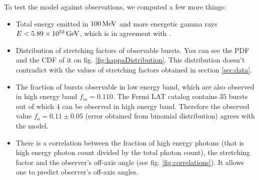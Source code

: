\documentclass[11pt,a4paper]{article}
\begin{document}
To test the model against observations, we computed a few more things:
\begin{itemize}
	\item{
		Total energy emitted in $\unit[100]{MeV}$ and more energetic gamma rays $E < \unit[5.89 \times 10^{53}]{GeV}$, which is in agreement with \cite{Gehrels:2013xd}.
	}
	\item{
		Distribution of stretching factors of observable bursts.
		You can see the PDF and the CDF of it on fig. \ref{fig:kappaDistribution}.
		This distribution doesn't contradict with the values of stretching factors obtained in section \ref{sec:data}.
	}
	\item{
		The fraction of bursts observable in low energy band, which are also observed in high energy band $f_m = 0.110$.
		The Fermi LAT catalog contains $35$ bursts out of which $4$ can be observed in high energy band.
		Therefore the observed value $f_o = 0.11 \pm 0.05$ (error obtained from binomial distribution) agrees with the model.
	}
	\item{
		There is a correlation between the fraction of high energy photons (that is high energy photon count divided by the total photon count), the stretching factor and the observer's off-axis angle (see fig. \ref{fig:correlations}). It allows one to predict observer's off-axis angles.
	}
\end{itemize}
\end{document}
